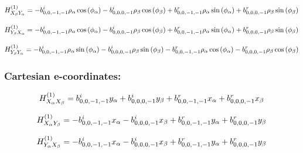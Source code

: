 \documentclass[fleqn]{article}
\begin{document}
\begin{dmath*}
H_{X_{\beta}Y_{\alpha}}^{(1)}=-  b^{i}_{0,0,-1,-1} \rho_{\alpha} \cos{\left (\phi_{\alpha} \right )} -  b^{i}_{0,0,0,-1} \rho_{\beta} \cos{\left (\phi_{\beta} \right )} +  b^{r}_{0,0,-1,-1} \rho_{\alpha} \sin{\left (\phi_{\alpha} \right )} +  b^{r}_{0,0,0,-1} \rho_{\beta} \sin{\left (\phi_{\beta} \right )}\\
\end{dmath*}

\begin{dmath*}
H_{Y_{\beta}X_{\alpha}}^{(1)}=-  b^{i}_{0,0,-1,-1} \rho_{\alpha} \cos{\left (\phi_{\alpha} \right )} -  b^{i}_{0,0,0,-1} \rho_{\beta} \cos{\left (\phi_{\beta} \right )} +  b^{r}_{0,0,-1,-1} \rho_{\alpha} \sin{\left (\phi_{\alpha} \right )} +  b^{r}_{0,0,0,-1} \rho_{\beta} \sin{\left (\phi_{\beta} \right )}\\
\end{dmath*}

\begin{dmath*}
H_{Y_{\beta}Y_{\alpha}}^{(1)}=-  b^{i}_{0,0,-1,-1} \rho_{\alpha} \sin{\left (\phi_{\alpha} \right )} -  b^{i}_{0,0,0,-1} \rho_{\beta} \sin{\left (\phi_{\beta} \right )} -  b^{r}_{0,0,-1,-1} \rho_{\alpha} \cos{\left (\phi_{\alpha} \right )} -  b^{r}_{0,0,0,-1} \rho_{\beta} \cos{\left (\phi_{\beta} \right )}\\
\end{dmath*}
\subsubsection*{Cartesian e-coordinates:}

\begin{dmath*}
H_{X_{\alpha}X_{\beta}}^{(1)}=b^{i}_{0,0,-1,-1} y_{\alpha} + b^{i}_{0,0,0,-1} y_{\beta} + b^{r}_{0,0,-1,-1} x_{\alpha} + b^{r}_{0,0,0,-1} x_{\beta}\\
\end{dmath*}

\begin{dmath*}
H_{X_{\alpha}Y_{\beta}}^{(1)}=-  b^{i}_{0,0,-1,-1} x_{\alpha} -  b^{i}_{0,0,0,-1} x_{\beta} +  b^{r}_{0,0,-1,-1} y_{\alpha} +  b^{r}_{0,0,0,-1} y_{\beta}\\
\end{dmath*}

\begin{dmath*}
H_{Y_{\alpha}X_{\beta}}^{(1)}=-  b^{i}_{0,0,-1,-1} x_{\alpha} -  b^{i}_{0,0,0,-1} x_{\beta} +  b^{r}_{0,0,-1,-1} y_{\alpha} +  b^{r}_{0,0,0,-1} y_{\beta}\\
\end{dmath*}
\end{document}

